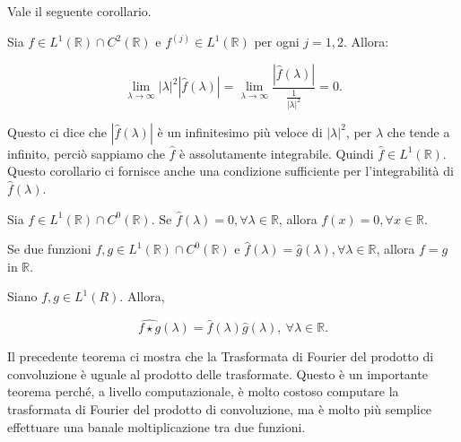 Vale il seguente corollario.

\begin{corollary}
    Sia $f \in L^1(\mathbb{R}) \cap C^2(\mathbb{R})$ e $f^{\left(j\right)} \in
        L^1(\mathbb{R})$ per ogni $j = 1, 2$. Allora:

    $$
        \lim_{\lambda \rightarrow \infty} \left| \lambda \right|^2 \left|
        \hat{f}(\lambda) \right|  = \lim_{\lambda \rightarrow \infty}
        \frac{\left|\hat{f}(\lambda)\right|}{ \frac{1}{ \left| \lambda
                \right|^2}} = 0.
    $$
\end{corollary}

Questo ci dice che $\left|\hat{f}(\lambda)\right|$ è un infinitesimo più veloce di
$\left|\lambda\right|^2$, per $\lambda$ che tende a infinito, perciò sappiamo che $\hat{f}$ è
assolutamente integrabile. Quindi $\hat{f} \in L^1(\mathbb{R})$. Questo
corollario ci fornisce anche una condizione sufficiente per l'integrabilità di
$\hat{f}(\lambda)$.

\begin{theorem}
    Sia $f \in L^1(\mathbb{R}) \cap C^0(\mathbb{R})$.
    Se $\hat{f}(\lambda) = 0, \forall \lambda \in \mathbb{R}$, allora $f(x) = 0, \forall x \in \mathbb{R}$.\\
\end{theorem}

\begin{corollary}
    Se due funzioni $f, g \in L^1(\mathbb{R}) \cap C^0(\mathbb{R})$ e $\hat{f}(\lambda) = \hat{g}(\lambda), \forall \lambda \in \mathbb{R}$,
    allora $f = g$ in $\mathbb{R}$.
\end{corollary}

\begin{theorem}
    Siano $f, g \in L^1(R)$. Allora,

    $$
        \widehat{f \star g}(\lambda) = \hat{f}(\lambda) \hat{g}(\lambda), \
        \forall \lambda \in \mathbb{R}.
    $$
\end{theorem}

Il precedente teorema ci mostra che la Trasformata di Fourier del prodotto di
convoluzione è uguale al prodotto delle trasformate. Questo è un importante teorema
perché, a livello computazionale, è molto costoso computare la trasformata di Fourier
del prodotto di convoluzione, ma è molto più semplice effettuare una banale moltiplicazione
tra due funzioni.